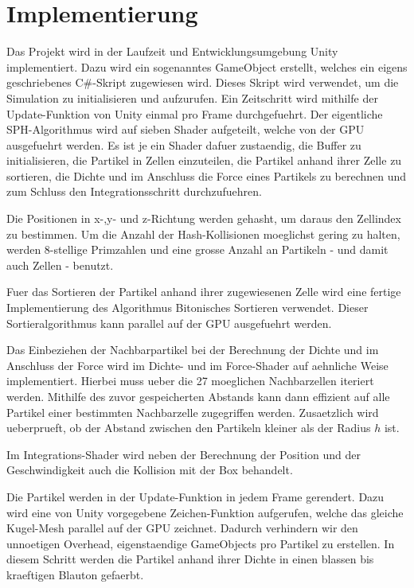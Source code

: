 \documentclass[a4paper]{paper}
\begin{document}
\section{Implementierung}
Das Projekt wird in der Laufzeit und Entwicklungsumgebung Unity implementiert. Dazu wird ein sogenanntes GameObject erstellt, welches ein eigens geschriebenes C\#-Skript zugewiesen wird. Dieses Skript wird verwendet, um die Simulation zu initialisieren und aufzurufen. %
Ein Zeitschritt wird mithilfe der Update-Funktion von Unity einmal pro Frame durchgefuehrt. Der eigentliche SPH-Algorithmus wird auf sieben Shader aufgeteilt, welche von der GPU ausgefuehrt werden. Es ist je ein Shader dafuer zustaendig, die Buffer zu initialisieren, die Partikel in Zellen einzuteilen, die Partikel anhand ihrer Zelle zu sortieren, die Dichte und im Anschluss die Force eines Partikels zu berechnen und zum Schluss den Integrationsschritt durchzufuehren.

Die Positionen in x-,y- und z-Richtung werden gehasht, um daraus den Zellindex zu bestimmen. Um die Anzahl der Hash-Kollisionen moeglichst gering zu halten, werden 8-stellige Primzahlen und eine grosse Anzahl an Partikeln - und damit auch Zellen - benutzt.

Fuer das Sortieren der Partikel anhand ihrer zugewiesenen Zelle wird eine fertige Implementierung des Algorithmus Bitonisches Sortieren verwendet. Dieser Sortieralgorithmus kann parallel auf der GPU ausgefuehrt werden.

Das Einbeziehen der Nachbarpartikel bei der Berechnung der Dichte und im Anschluss der Force wird im Dichte- und im Force-Shader auf aehnliche Weise implementiert. Hierbei muss ueber die 27 moeglichen Nachbarzellen iteriert werden. Mithilfe des zuvor gespeicherten Abstands kann dann effizient auf alle Partikel einer bestimmten Nachbarzelle zugegriffen werden. Zusaetzlich wird ueberprueft, ob der Abstand zwischen den Partikeln kleiner als der Radius $h$ ist.

Im Integrations-Shader wird neben der Berechnung der Position und der Geschwindigkeit auch die Kollision mit der Box behandelt.

Die Partikel werden in der Update-Funktion in jedem Frame gerendert. Dazu wird eine von Unity vorgegebene Zeichen-Funktion aufgerufen, welche das gleiche Kugel-Mesh parallel auf der GPU zeichnet. Dadurch verhindern wir den unnoetigen Overhead, eigenstaendige GameObjects pro Partikel zu erstellen. In diesem Schritt werden die Partikel anhand ihrer Dichte in einen blassen bis kraeftigen Blauton gefaerbt.
\end{document}
